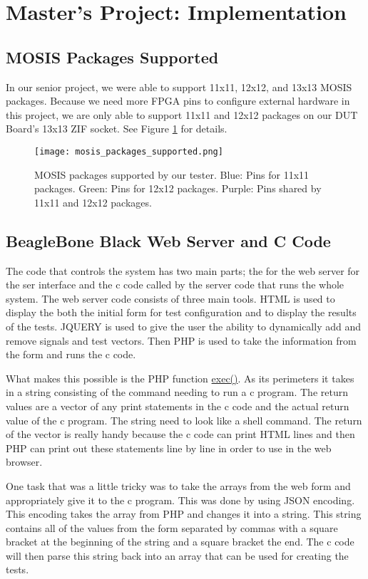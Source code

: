 \section{Master's Project: Implementation}

\subsection{MOSIS Packages Supported}
In our senior project, we were able to support 11x11, 12x12, and 13x13 MOSIS packages. Because we need more FPGA pins to configure external hardware in this project, we are only able to support 11x11 and 12x12 packages on our DUT Board's 13x13 ZIF socket. See Figure \ref{fig:mosis_packages_supported} for details.

\begin{figure}
\texttt{[image: mosis\_packages\_supported.png]}
\caption{MOSIS packages supported by our tester. Blue: Pins for 11x11 packages. Green: Pins for 12x12 packages. Purple: Pins shared by 11x11 and 12x12 packages.}
\label{fig:mosis_packages_supported}
\end{figure}

\subsection{BeagleBone Black Web Server and C Code}
The code that controls the system has two main parts; the for the web server for the ser interface and the c code called by the server code that runs the whole system. The web server code consists of three main tools. HTML is used to display the both the initial form for test configuration and to display the results of the tests. JQUERY is used to give the user the ability to dynamically add and remove signals and test vectors. Then PHP is used to take the information from the form and runs the c code. 

What makes this possible is the PHP function \href{http://php.net/manual/en/function.exec.php}{exec()}. As its perimeters it takes in a string consisting of the command needing to run a c program. The return values are a vector of any print statements in the c code and the actual return value of the c program. The string need to look like a shell command. The return of the vector is really handy because the c code can print HTML lines and then PHP can print out these statements line by line in order to use in the web browser.

One task that was a little tricky was to take the arrays from the web form and appropriately give it to the c program. This was done by using JSON encoding. This encoding takes the array from PHP and changes it into a string. This string contains all of the values from the form separated by commas with a square bracket at the beginning of the string and a square bracket the end. The c code will then parse this string back into an array that can be used for creating the tests.


